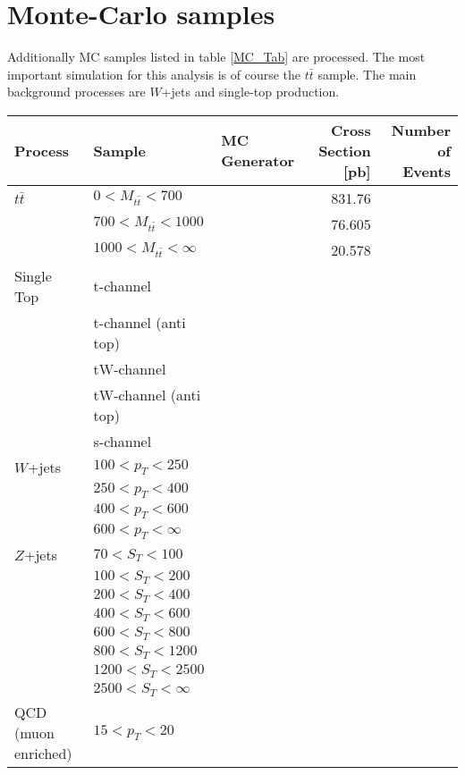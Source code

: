 	\section{Monte-Carlo samples}
	Additionally MC samples listed in table \ref{MC_Tab} are processed. The most important simulation for this analysis is of course the $t\bar{t}$ sample. The main background processes are $W$+jets and single-top production.
	\begin{landscape}
	\begin{table}
	\centering
	 \begin{tabular}{l l l r r }
	 	Process & Sample  & MC Generator & Cross Section [pb] & Number of Events \\
	 	\hline
	 	\hline
	 	$t\bar{t}$ & $0 < M_{t\bar{t}} < 700$ & & 831.76 &  \\
	 	           & $700 < M_{t\bar{t}} < 1000$ & & 76.605 &  \\
	 	           & $1000 < M_{t\bar{t}} < \infty$ & & 20.578 & \\
	 	\hline
		Single Top & t-channel  & & & \\
		           & t-channel (anti top) & & & \\
		           & tW-channel & & & \\
		           & tW-channel (anti top) & & & \\
		           & s-channel & & & \\
		\hline
		$W$+jets & $100 < p_T < 250$ & & & \\
	 	         & $250 < p_T < 400$ & & & \\
	 	         & $400 < p_T < 600$ & & & \\
	 	         & $600 < p_T < \infty$ & & & \\
	 	\hline
	 	$Z$+jets & $70 < S_T < 100$ & & & \\
	 	         & $100 < S_T < 200$ & & & \\
	 	         & $200 < S_T < 400$ & & & \\
	 	         & $400 < S_T < 600$ & & & \\
	 	         & $600 < S_T < 800$ & & & \\
	 	         & $800 < S_T < 1200$ & & & \\
	 	         & $1200 < S_T < 2500$ & & & \\
	 	         & $2500 < S_T < \infty$ & & & \\
	 	\hline
	 	QCD (muon enriched) & $15 < p_T < 20$ & & & \\

\end{tabular}
\end{table}
\end{landscape}
